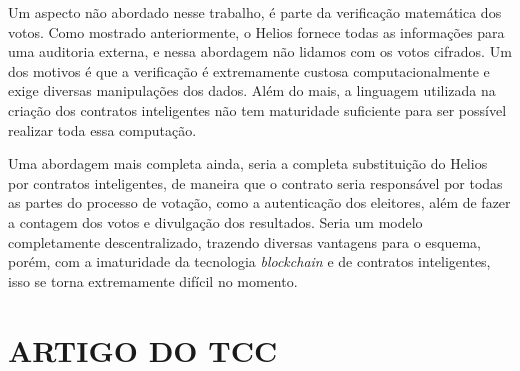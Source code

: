 \documentclass{ufsctex/ufsctex}
\begin{document}
Um aspecto não abordado nesse trabalho, é parte da verificação matemática dos
votos. Como mostrado anteriormente, o Helios fornece todas as informações para
uma auditoria externa, e nessa abordagem não lidamos com os votos cifrados.  Um
dos motivos é que a verificação é extremamente custosa computacionalmente e
exige diversas manipulações dos dados. Além do mais, a linguagem utilizada na
criação dos contratos inteligentes não tem maturidade suficiente para ser
possível realizar toda essa computação.

Uma abordagem mais completa ainda, seria a completa substituição do Helios por
contratos inteligentes, de maneira que o contrato seria responsável por todas
as partes do processo de votação, como a autenticação dos eleitores, além de
fazer a contagem dos votos e divulgação dos resultados. Seria um modelo
completamente descentralizado, trazendo diversas vantagens para o esquema,
porém, com a imaturidade da tecnologia \textit{blockchain} e de contratos
inteligentes, isso se torna extremamente difícil no momento.




\apendice{}

\chapter{ARTIGO DO TCC}
\end{document}
